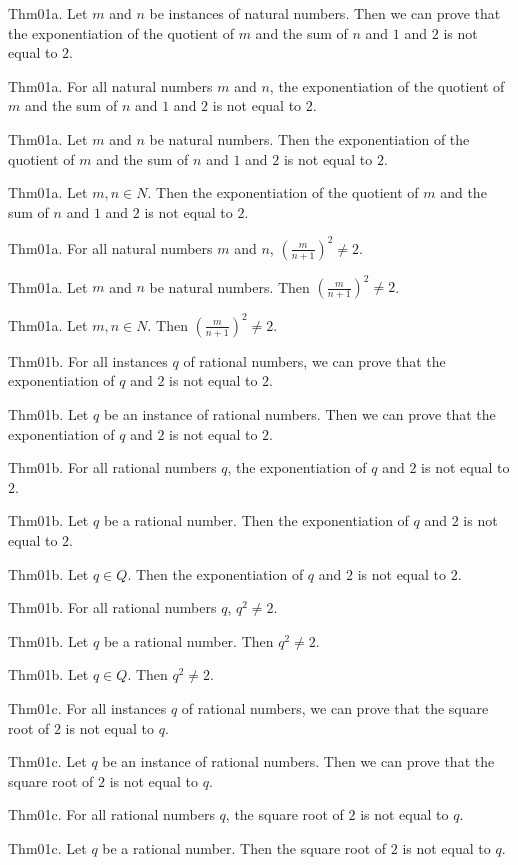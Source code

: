 \documentclass{article}
\begin{document}
Thm01a. Let $m$ and $n$ be instances of natural numbers. Then we can prove that the exponentiation of the quotient of $m$ and the sum of $n$ and $1$ and $2$ is not equal to $2$.

Thm01a. For all natural numbers $m$ and $n$, the exponentiation of the quotient of $m$ and the sum of $n$ and $1$ and $2$ is not equal to $2$.

Thm01a. Let $m$ and $n$ be natural numbers. Then the exponentiation of the quotient of $m$ and the sum of $n$ and $1$ and $2$ is not equal to $2$.

Thm01a. Let $m , n \in N$. Then the exponentiation of the quotient of $m$ and the sum of $n$ and $1$ and $2$ is not equal to $2$.

Thm01a. For all natural numbers $m$ and $n$, $(\frac{ m}{n + 1})^ {2}\neq 2$.

Thm01a. Let $m$ and $n$ be natural numbers. Then $(\frac{ m}{n + 1})^ {2}\neq 2$.

Thm01a. Let $m , n \in N$. Then $(\frac{ m}{n + 1})^ {2}\neq 2$.

Thm01b. For all instances $q$ of rational numbers, we can prove that the exponentiation of $q$ and $2$ is not equal to $2$.

Thm01b. Let $q$ be an instance of rational numbers. Then we can prove that the exponentiation of $q$ and $2$ is not equal to $2$.

Thm01b. For all rational numbers $q$, the exponentiation of $q$ and $2$ is not equal to $2$.

Thm01b. Let $q$ be a rational number. Then the exponentiation of $q$ and $2$ is not equal to $2$.

Thm01b. Let $q \in Q$. Then the exponentiation of $q$ and $2$ is not equal to $2$.

Thm01b. For all rational numbers $q$, $q ^ {2}\neq 2$.

Thm01b. Let $q$ be a rational number. Then $q ^ {2}\neq 2$.

Thm01b. Let $q \in Q$. Then $q ^ {2}\neq 2$.

Thm01c. For all instances $q$ of rational numbers, we can prove that the square root of $2$ is not equal to $q$.

Thm01c. Let $q$ be an instance of rational numbers. Then we can prove that the square root of $2$ is not equal to $q$.

Thm01c. For all rational numbers $q$, the square root of $2$ is not equal to $q$.

Thm01c. Let $q$ be a rational number. Then the square root of $2$ is not equal to $q$.
\end{document}
